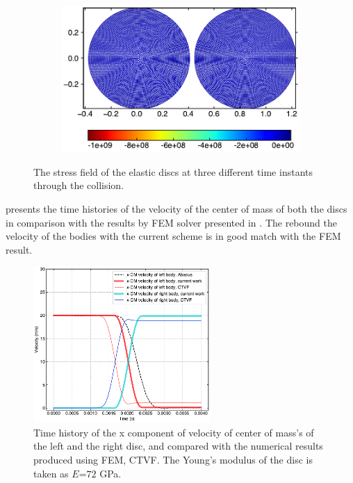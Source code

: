 \begin{figure}[!htpb]
  \begin{subfigure}{0.48\textwidth}
    \centering
    \includegraphics[width=1.0\textwidth]{figures/csph/figures/yan_2021_curved_interface/collision_ctvf/time2}
    \label{fig:rings:ipst-nu-0.47-2}
  \end{subfigure}
  \caption{The stress field of the elastic discs at three different time
    instants through the collision.}
\label{fig:yan-2021-curved:improved-ipst-nu-0-47}
\end{figure}

 presents the time histories of
the velocity of the center of mass of both the discs in comparison with the
results by FEM solver presented in \parencite{yan2021simulation}. The rebound the
velocity of the bodies with the current scheme is in good match with the FEM
result.
\begin{figure}[!htpb]
  \centering
  \includegraphics[width=0.6\textwidth]{figures/csph/figures/yan_2021_curved_interface/velocity_vs_time}
  \caption{Time history of the x component of velocity of center of mass's of
    the left and the right disc, and compared with the numerical results
    produced using FEM, CTVF. The Young's modulus of the disc is taken as
    $E$=$72$ GPa.}
\label{fig:results-yan-curved-velocity-vs-time}
\end{figure}

